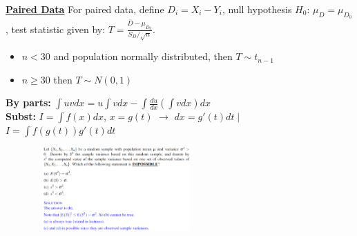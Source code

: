 \documentclass[10pt,landscape]{article}
\begin{document}
\begin{multicols*}{3}
\textbf{\underline{Paired Data}}
For paired data, define $D_i = X_i - Y_i$, null hypothesis $H_0$: $\mu_D = \mu_D_0$, test statistic given by: $T = \frac{\overline{D} - \mu_{D_0}}{S_D / \sqrt{n}}$.
\begin{itemize}[topsep=0pt,noitemsep,wide=0pt, leftmargin=\dimexpr{} + 2\relax]
    \item \textbf{$n < 30$} and population normally distributed, then $T \sim t_{n-1}$
    \item \textbf{$n \geq 30$} then $T \sim N(0,1)$
\end{itemize}


\textbf{By parts:} $\int u v dx = u \int v dx - \int \frac{du}{dx} (\int v dx) dx$ \\ 
\textbf{Subst:} $I = \int f(x) dx$, $x =g(t)$ $\rightarrow$ $dx = g'(t) dt \mid$ $I = \int f(g(t)) g'(t) dt$

\includegraphics*[width=8.5cm, height=3.2cm]{exampleqn.png}

\end{multicols*}
\end{document}
